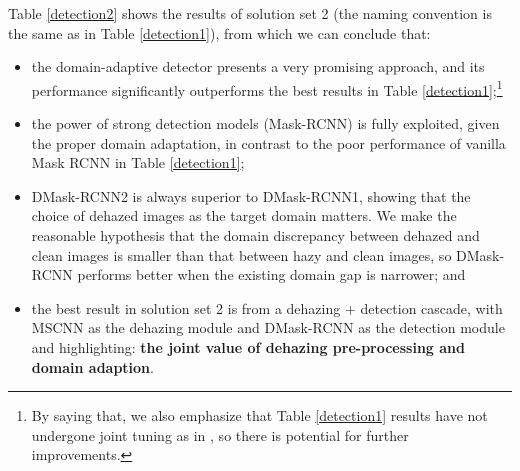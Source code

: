 \documentclass[10pt,twocolumn,letterpaper]{article}
\begin{document}
Table \ref{detection2} shows the results of solution set 2 (the naming convention is the same as in Table \ref{detection1}), from which we can conclude that:

\begin{itemize}
\item the domain-adaptive detector presents a very promising approach, and its performance significantly outperforms the best results in Table \ref{detection1};\footnote{By saying that, we also emphasize that Table \ref{detection1} results have not undergone joint tuning as in \cite{liu2017enhance,li2017aod}, so there is potential for further improvements.} 

\item the power of strong detection models (Mask-RCNN) is fully exploited, given the proper domain adaptation, in contrast to the poor performance of vanilla Mask RCNN in Table \ref{detection1};

\item DMask-RCNN2 is always superior to DMask-RCNN1, showing that the choice of dehazed images as the target domain matters. We make the reasonable hypothesis that the domain discrepancy between dehazed and clean images is smaller than that between hazy and clean images, so DMask-RCNN performs better when the existing domain gap is narrower; and

\item the best result in solution set 2 is from a dehazing + detection cascade, with MSCNN as the dehazing module and DMask-RCNN as the detection module and highlighting: \textbf{the joint value of dehazing pre-processing and domain adaption}.
\end{itemize}
 




\end{document}
